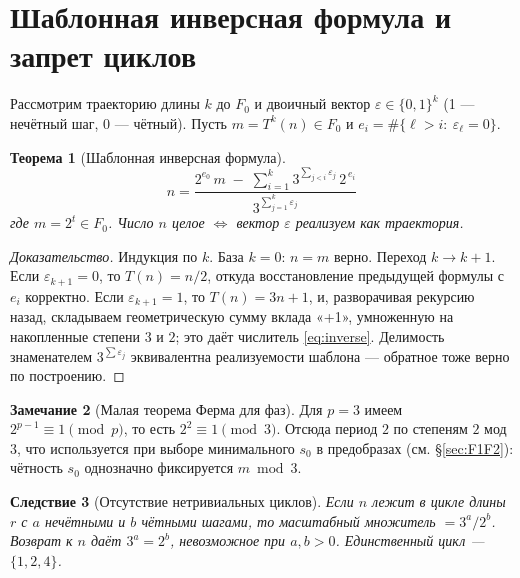 \documentclass[a4paper,12pt]{article}
\theoremstyle{plain}
\newtheorem{theorem}{Теорема}[section]
\newtheorem{corollary}[theorem]{Следствие}
\theoremstyle{definition}
\newtheorem{remark}[theorem]{Замечание}
\begin{document}
\section{Шаблонная инверсная формула и запрет циклов}\label{sec:inverse}
Рассмотрим траекторию длины $k$ до $F_0$ и двоичный вектор $\varepsilon\in\{0,1\}^k$ (1 — нечётный шаг, 0 — чётный). Пусть $m=T^k(n)\in F_0$ и $e_i=\#\{\ell>i:\ \varepsilon_\ell=0\}$.

\begin{theorem}[Шаблонная инверсная формула]\label{thm:inverse}
\begin{equation}\label{eq:inverse}
\boxed{\quad
n
=\frac{2^{e_0}\,m \;-\;
     \displaystyle\sum_{i=1}^k
       3^{\sum_{j< i}\varepsilon_j}\,2^{\,e_i}}
     {3^{\sum_{j=1}^k\varepsilon_j}}
\quad}
\end{equation}
где $m=2^t\in F_0$. Число $n$ целое $\iff$ вектор $\varepsilon$ реализуем как траектория. 
\end{theorem}

\begin{proof}[Доказательство]
Индукция по $k$. База $k=0$: $n=m$ верно. Переход $k\to k+1$. Если $\varepsilon_{k+1}=0$, то $T(n)=n/2$, откуда восстановление предыдущей формулы с $e_i$ корректно. Если $\varepsilon_{k+1}=1$, то $T(n)=3n+1$, и, разворачивая рекурсию назад, складываем геометрическую сумму вклада «+1», умноженную на накопленные степени $3$ и $2$; это даёт числитель \eqref{eq:inverse}. Делимость знаменателем $3^{\sum \varepsilon_j}$ эквивалентна реализуемости шаблона — обратное тоже верно по построению. 
\end{proof}

\begin{remark}[Малая теорема Ферма для фаз]
Для $p=3$ имеем $2^{p-1}\equiv1\pmod p$, то есть $2^2\equiv1\pmod3$. Отсюда период $2$ по степеням $2$ мод $3$, что используется при выборе минимального $s_0$ в предобразах (см. \S\ref{sec:F1F2}): чётность $s_0$ однозначно фиксируется $m\bmod3$.
\end{remark}

\begin{corollary}[Отсутствие нетривиальных циклов]\label{cor:nocycles-inverse}
Если $n$ лежит в цикле длины $r$ с $a$ нечётными и $b$ чётными шагами, то масштабный множитель $=3^a/2^b$. Возврат к $n$ даёт $3^a=2^b$, невозможное при $a,b>0$. Единственный цикл — $\{1,2,4\}$.
\end{corollary}

\end{document}

